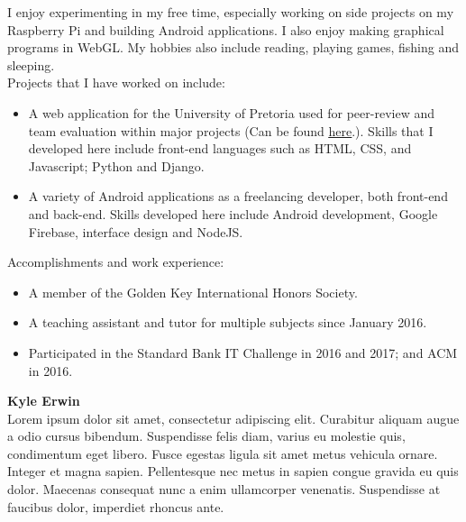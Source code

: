     I enjoy experimenting in my free time, especially working on side projects on my Raspberry Pi and building Android applications. I also enjoy making graphical programs in WebGL. My hobbies also include reading, playing games, fishing and sleeping. \\
    
    \noindent
    Projects that I have worked on include:
    \begin{itemize}
        \item A web application for the University of Pretoria used for peer-review and team evaluation within major projects (Can be found \href{https://github.com/teampinocchio/pinocchio/wiki}{\underline{here}}.). Skills that I developed here include front-end languages such as HTML, CSS, and Javascript; Python and Django.
    
        \item A variety of Android applications as a freelancing developer, both front-end and back-end. Skills developed here include Android development, Google Firebase, interface design and NodeJS.
    \end{itemize}
    
    \noindent
	Accomplishments and work experience:
    \begin{itemize}
        \item A member of the Golden Key International Honors Society.
        \item A teaching assistant and tutor for multiple subjects since January 2016.
        \item Participated in the Standard Bank IT Challenge in 2016 and 2017; and ACM in 2016.
    \end{itemize}

\textbf{Kyle Erwin}\\
Lorem ipsum dolor sit amet, consectetur adipiscing elit. Curabitur aliquam augue a odio cursus bibendum. Suspendisse felis diam, varius eu molestie quis, condimentum eget libero. Fusce egestas ligula sit amet metus vehicula ornare. Integer et magna sapien. Pellentesque nec metus in sapien congue gravida eu quis dolor. Maecenas consequat nunc a enim ullamcorper venenatis. Suspendisse at faucibus dolor, imperdiet rhoncus ante.\\ \\

